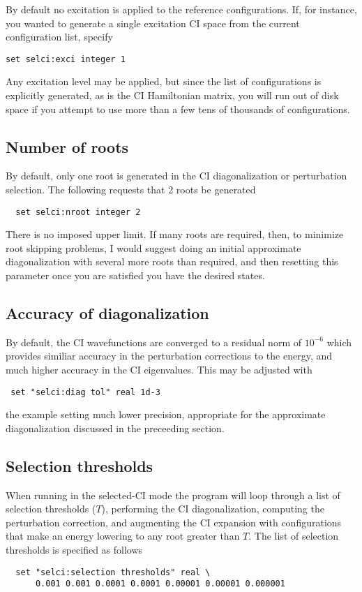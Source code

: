 By default no excitation is applied to the reference configurations.
If, for instance, you wanted to generate a single excitation CI space
from the current configuration list, specify
\begin{verbatim}
set selci:exci integer 1
\end{verbatim}
Any excitation level may be applied, but since the list of
configurations is explicitly generated, as is the CI Hamiltonian
matrix, you will run out of disk space if you attempt to use more than
a few tens of thousands of configurations.

\subsection{Number of roots}

By default, only one root is generated in the CI diagonalization or
perturbation selection.  The following requests that 2 roots be
generated
\begin{verbatim}
  set selci:nroot integer 2
\end{verbatim}
There is no imposed upper limit.  If many roots are required, then, to
minimize root skipping problems, I would suggest doing an initial
approximate diagonalization with several more roots than required,
and then resetting this parameter once you are satisfied you have the
desired states.

\subsection{Accuracy of diagonalization}

By default, the CI wavefunctions are converged to a residual norm of
$10^{-6}$ which provides similiar accuracy in the perturbation
corrections to the energy, and much higher accuracy in the CI
eigenvalues.  This may be adjusted with
\begin{verbatim}
 set "selci:diag tol" real 1d-3
\end{verbatim}
the example setting much lower precision, appropriate for the
approximate diagonalization discussed in the preceeding section.

\subsection{Selection thresholds}

When running in the selected-CI mode the program will loop
through a list of selection thresholds ($T$), performing the CI
diagonalization, computing the perturbation correction, and augmenting
the CI expansion with configurations that make an energy lowering to
any root greater than $T$.  The list of selection thresholds is
specified as follows
\begin{verbatim}
  set "selci:selection thresholds" real \
      0.001 0.001 0.0001 0.0001 0.00001 0.00001 0.000001
\end{verbatim}

